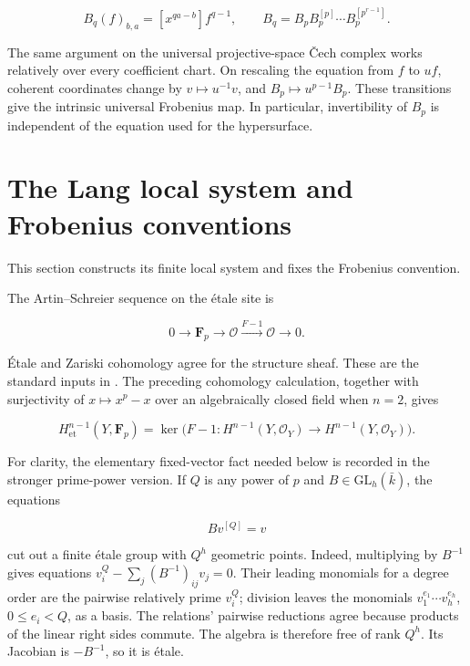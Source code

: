 \documentclass[11pt]{article}
\begin{document}
\begin{equation}
 B_q(f)_{b,a}=[x^{qa-b}]f^{q-1},\qquad
 B_q=B_pB_p^{[p]}\cdots B_p^{[p^{r-1}]}.                                 \label{eq:pn-1-5}
\end{equation}

The same argument on the universal projective-space Čech complex works
relatively over every coefficient chart. On rescaling the equation from
\(f\) to \(uf\), coherent coordinates change by \(v\mapsto u^{-1}v\), and
\(B_p\mapsto u^{p-1}B_p\). These transitions give the intrinsic universal
Frobenius map. In particular, invertibility of \(B_p\) is independent of
the equation used for the hypersurface.

\section{The Lang local system and Frobenius conventions}\label{sec:pn-2}

This section constructs its finite local system and fixes the Frobenius convention.

The Artin--Schreier sequence on the étale site is

\begin{equation}
 0\to\mathbf F_p\to\mathcal O\xrightarrow{F-1}\mathcal O\to0.             \label{eq:pn-2-1}
\end{equation}

Étale and Zariski cohomology agree for the structure sheaf. These are the standard inputs in \citet[Section 59.63, Tag 0A3J]{StacksAS}.
The preceding cohomology calculation, together with surjectivity of
\(x\mapsto x^p-x\) over an algebraically closed field when \(n=2\), gives

\begin{equation}
 H^{n-1}_{\mathrm{et}}(Y,\mathbf F_p)
 =\ker\bigl(F-1:H^{n-1}(Y,\mathcal O_Y)\to H^{n-1}(Y,\mathcal O_Y)\bigr).  \label{eq:pn-2-2}
\end{equation}

For clarity, the elementary fixed-vector fact needed below is recorded in
the stronger prime-power version. If \(Q\) is any power of \(p\) and
\(B\in\mathrm{GL}_h(\bar k)\), the equations

\begin{equation}
                       Bv^{[Q]}=v                                    \label{eq:pn-2-3}
\end{equation}

cut out a finite étale group with \(Q^h\) geometric points. Indeed,
multiplying by \(B^{-1}\) gives equations
\(v_i^Q-\sum_j(B^{-1})_{ij}v_j=0\). Their leading monomials for a degree
order are the pairwise relatively prime \(v_i^Q\); division leaves the
monomials \(v_1^{e_1}\cdots v_h^{e_h}\), \(0\leq e_i<Q\), as a basis.
The relations' pairwise reductions agree because products of the linear
right sides commute. The algebra is therefore free of rank \(Q^h\).
Its Jacobian is \(-B^{-1}\), so it is étale.
\end{document}
